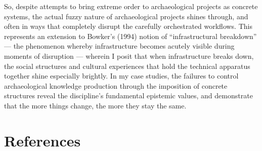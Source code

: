 \documentclass[
]{article}
\begin{document}
So, despite attempts to bring extreme order to archaeological projects
as concrete systems, the actual fuzzy nature of archaeological projects
shines through, and often in ways that completely disrupt the carefully
orchestrated workflows. This represents an extension to Bowker's (1994)
notion of ``infrastructural breakdown'' --- the phenomenon whereby
infrastructure becomes acutely visible during moments of disruption ---
wherein I posit that when infrastructure breaks down, the social
structures and cultural experiences that hold the technical apparatus
together shine especially brightly. In my case studies, the failures to
control archaeological knowledge production through the imposition of
concrete structures reveal the discipline's fundamental epistemic
values, and demonstrate that the more things change, the more they stay
the same.

\section{References}\label{references}
\end{document}
